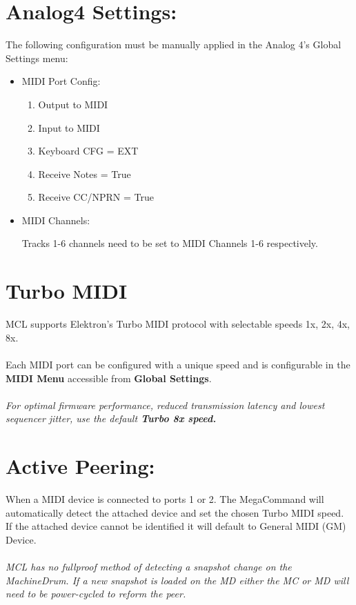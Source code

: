 \section{Analog4 Settings:}

The following configuration must be manually applied in the Analog 4's Global Settings menu:

\begin{itemize}

\item{MIDI Port Config:}
\begin{enumerate}
\item{Output to MIDI}
\item{Input to MIDI}
\item{Keyboard CFG = EXT}
\item{Receive Notes = True}
\item{Receive CC/NPRN = True}
\end{enumerate}
\item{MIDI Channels:}

Tracks 1-6 channels need to be set to MIDI Channels 1-6 respectively.

\end{itemize}

\section{Turbo MIDI}

MCL supports Elektron's Turbo MIDI protocol with selectable speeds 1x, 2x, 4x, 8x.\\
\\
Each MIDI port can be configured with a unique speed and is configurable in the \textbf{MIDI Menu} accessible from \textbf{Global Settings}.
\\
\\
\textit{For optimal firmware performance, reduced transmission latency and lowest sequencer jitter, use the default \textbf{Turbo 8x speed.}}

\section{Active Peering:}

When a MIDI device is connected to ports 1 or 2. The MegaCommand will automatically detect the attached device and set the chosen Turbo MIDI speed. If the attached device cannot be identified it will default to General MIDI (GM) Device.\\
\\
\textit{MCL has no fullproof method of detecting a snapshot change on the MachineDrum. If a new snapshot is loaded on the MD either the MC or MD will need to be power-cycled to reform the peer.}


 
